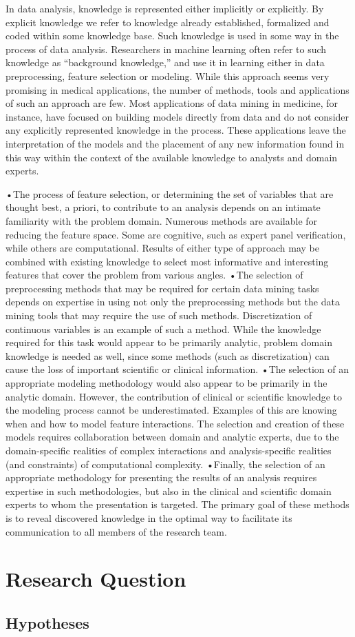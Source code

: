 \documentclass[10pt,a4paper]{article}
\begin{document}
	In data analysis, knowledge is represented either implicitly or explicitly. By explicit knowledge we refer to knowledge already established, formalized and coded within some knowledge base. Such knowledge is used in some way in the process of data analysis. Researchers in machine learning often refer to such knowledge as “background knowledge,” and use it in learning either in data preprocessing, feature selection or modeling. While this approach seems very promising in medical applications, the number of methods, tools and applications of such an approach are few. Most applications of data mining in medicine, for instance, have focused on building models directly from data and do not consider any explicitly represented knowledge in the process. These applications leave the interpretation of the models and the placement of any new information found in this way within the context of the available knowledge to analysts and domain experts. \cite{zupan2006knowledge}
	
	•The process of feature selection, or determining the set of variables that are thought best, a priori, to contribute to an analysis depends on an intimate familiarity with the problem domain. Numerous methods are available for reducing the feature space. Some are cognitive, such as expert panel verification, while others are computational. Results of either type of approach may be combined with existing knowledge to select most informative and interesting features that cover the problem from various angles.
	•The selection of preprocessing methods that may be required for certain data mining tasks depends on expertise in using not only the preprocessing methods but the data mining tools that may require the use of such methods. Discretization of continuous variables is an example of such a method. While the knowledge required for this task would appear to be primarily analytic, problem domain knowledge is needed as well, since some methods (such as discretization) can cause the loss of important scientific or clinical information.
	•The selection of an appropriate modeling methodology would also appear to be primarily in the analytic domain. However, the contribution of clinical or scientific knowledge to the modeling process cannot be underestimated. Examples of this are knowing when and how to model feature interactions. The selection and creation of these models requires collaboration between domain and analytic experts, due to the domain-specific realities of complex interactions and analysis-specific realities (and constraints) of computational complexity.
	•Finally, the selection of an appropriate methodology for presenting the results of an analysis requires expertise in such methodologies, but also in the clinical and scientific domain experts to whom the presentation is targeted. The primary goal of these methods is to reveal discovered knowledge in the optimal way to facilitate its communication to all members of the research team.\cite{zupan2006knowledge}
	
	\section{Research Question}
	
	\subsection{Hypotheses}
	
	 
	
	
\end{document}
